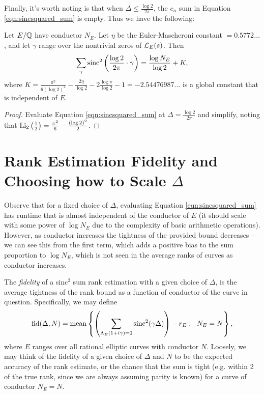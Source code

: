 Finally, it's worth noting is that when $\Delta \le \frac{\log 2}{2\pi}$, the $c_n$ sum in Equation \ref{eqn:sincsquared_sum} is empty. Thus we have the following:
\begin{corollary}[GRH]
Let $E/\mathbb{Q}$ have conductor $N_E$. Let $\eta$ be the Euler-Mascheroni constant $=0.5772\ldots$, and let $\gamma$ range over the nontrivial zeros of $\mathcal{L}_E(s)$. Then
\begin{equation}
\sum_{\gamma} \operatorname{sinc}^2\left(\frac{\log 2}{2\pi} \cdot \gamma \right) = \frac{\log N_E}{\log 2} + K,
\end{equation}
where $K = \frac{\pi^2}{6(\log 2)^2} - \frac{2\eta}{\log 2} - 2\frac{\log \pi}{\log 2} - 1 = -2.54476987\ldots$ is a global constant that is independent of $E$.
\end{corollary}
\begin{proof}
Evaluate Equation \ref{eqn:sincsquared_sum} at $\Delta = \frac{\log 2}{2\pi}$ and simplify, noting that $\operatorname{Li}_2\left(\frac{1}{2}\right) = \frac{\pi^2}{6} - \frac{(\log 2)^2}{2}$.
\end{proof}

\newpage
\section{Rank Estimation Fidelity and Choosing how to Scale $\Delta$}

Observe that for a fixed choice of $\Delta$, evaluating Equation \ref{eqn:sincsquared_sum} has runtime that is almost independent of the conductor of $E$ (it should scale with some power of $\log N_E$ due to the complexity of basic arithmetic operations). However, as conductor increases the tightness of the provided bound decreases -- we can see this from the first term, which adds a positive bias to the sum proportion to $\log N_E$, which is not seen in the average ranks of curves as conductor increases. \\

\begin{definition}
The {\it fidelity} of a sinc$^2$ sum rank estimation with a given choice of $\Delta$, is the average tightness of the rank bound as a function of conductor of the curve in question. Specifically, we may define
\begin{equation}
\mbox{fid}(\Delta,N) = \mbox{mean}\left\{\left(\sum_{\Lambda_E(1+i\gamma)=0}\operatorname{sinc}^2(\gamma \Delta)\right) - r_E:\;\; N_E = N\right\},
\end{equation}
where $E$ ranges over all rational elliptic curves with conductor $N$. Loosely, we may think of the fidelity of a given choice of $\Delta$ and $N$ to be the expected accuracy of the rank estimate, or the chance that the sum is tight (e.g. within 2 of the true rank, since we are always assuming parity is known) for a curve of conductor $N_E=N$. 
\end{definition}

